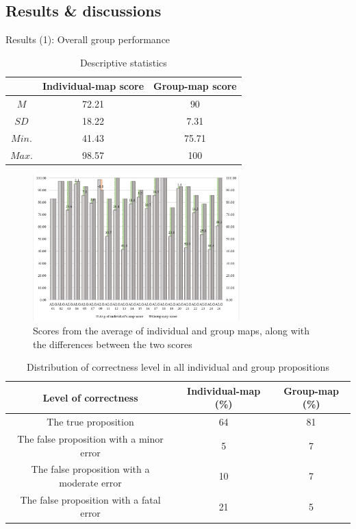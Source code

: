 \subsection{Results \& discussions}
\begin{frame}[allowframebreaks]{Results (1): Overall group performance}
\begin{table}[tb]
    \caption{Descriptive statistics}
    \label{a1::group_performance}
    \begin{center}
        \begin{tabular}{c|c|c}
            \hline
            & Individual-map score & Group-map score\\
            \hline
            $M$ & 72.21 & 90 \\
            $SD$ & 18.22 & 7.31 \\
            $Min.$ & 41.43 & 75.71 \\
            $Max.$ & 98.57 & 100 \\
            \hline
        \end{tabular}
    \end{center}
\end{table}

\begin{figure}[tb]
    \begin{center}
        \includegraphics[width=80mm]{images/a1_mapscore_distribution.pdf}
    \end{center}
    \caption{Scores from the average of individual and group maps, along with the differences between the two scores}
    \label{a1::mapscore_distribution}
\end{figure}

\begin{table}[tb]
    \caption{Distribution of correctness level in all individual and group propositions}
    \label{dist_correct}
    \begin{center}
        \begin{tabular}{c|c|c}
            \hline
            Level of correctness & Individual-map (\%) & Group-map (\%)\\
            \hline
            The true proposition & 64 & 81 \\
            The false proposition with a minor error & 5 & 7 \\
            The false proposition with a moderate error & 10 & 7 \\
            The false proposition with a fatal error & 21 & 5 \\
            \hline
        \end{tabular}
    \end{center}
\end{table}


\end{frame}
